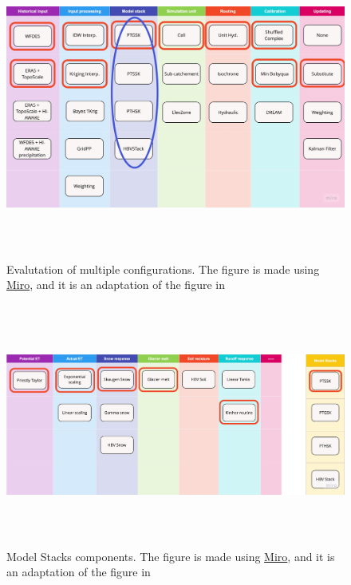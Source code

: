 \begin{figure}[ht]
    \centering
    \includegraphics[width=1.1\textwidth,height=10cm]{figures/methods/configs-4.jpg}
    \caption{Evalutation of multiple configurations. The figure is made using \href{https://miro.com}{Miro}, and it is an adaptation of the figure in \autocite{burkhartShyftV4Framework2021}}
    \label{fig:configurations}
\end{figure}

\begin{figure}[ht]
    \centering
    \includegraphics[width=1.1\textwidth,height=8cm]{figures/methods/configs.jpg}
    \caption{Model Stacks components. The figure is made using \href{https://miro.com}{Miro}, and it is an adaptation of the figure in \autocite{burkhartShyftV4Framework2021}}
    \label{fig:model_stack}
\end{figure}


